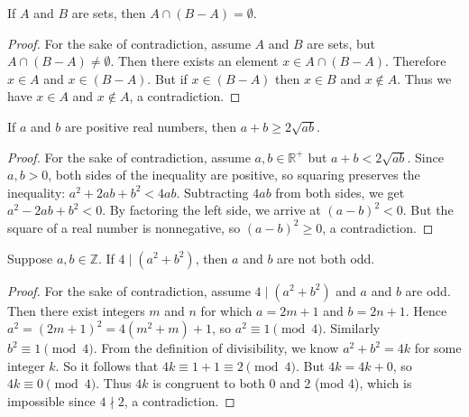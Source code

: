 \documentclass[DIN, pagenumber=false, fontsize=11pt, parskip=half]{scrartcl}
\begin{document}
\begin{problems}
    \problem If $A$ and $B$ are sets, then $A \cap (B - A) = \emptyset$.
    \begin{proof}
        For the sake of contradiction, assume $A$ and $B$ are sets, but $A \cap (B - A) \neq \emptyset$.
        Then there exists an element $x \in A \cap (B - A)$.
        Therefore $x \in A$ and $x \in (B - A)$.
        But if $x \in (B - A)$ then $x \in B$ and $x \notin A$.
        Thus we have $x \in A$ and $x \notin A$, a contradiction.
    \end{proof}

    \problem If $a$ and $b$ are positive real numbers, then $a + b \geq 2\sqrt{ab}$.
    \begin{proof}
        For the sake of contradiction, assume $a,b \in \mathbb{R}^+$ but $a + b < 2\sqrt{ab}$.
        Since $a, b > 0$, both sides of the inequality are positive, so squaring preserves the inequality: $a^2+2ab+b^2 < 4ab$.
        Subtracting $4ab$ from both sides, we get $a^2 - 2ab + b^2 < 0$.
        By factoring the left side, we arrive at $(a-b)^2 < 0$.
        But the square of a real number is nonnegative, so $(a-b)^2 \geq 0$, a contradiction.
    \end{proof}

    \problem Suppose $a,b \in \mathbb{Z}$. If $4 \mid (a^2 + b^2)$, then $a$ and $b$ are not both odd.
    \begin{proof}
        For the sake of contradiction, assume $4 \mid (a^2 + b^2)$ and $a$ and $b$ are odd.
        Then there exist integers $m$ and $n$ for which $a = 2m + 1$ and $b = 2n + 1$.
        Hence $a^2 = (2m+1)^2 = 4(m^2+m)+1$, so $a^2 \equiv 1 \pmod{4}$. Similarly $b^2 \equiv 1 \pmod{4}$.
        From the definition of divisibility, we know $a^2 + b^2 = 4k$ for some integer $k$. So it follows that $4k \equiv 1 + 1 \equiv 2 \pmod{4}$.
        But $4k = 4k + 0$, so $4k \equiv 0 \pmod{4}$.
        Thus $4k$ is congruent to both 0 and 2 (mod 4), which is impossible since $4 \nmid 2$, a contradiction.
    \end{proof}

\end{problems}
\end{document}
